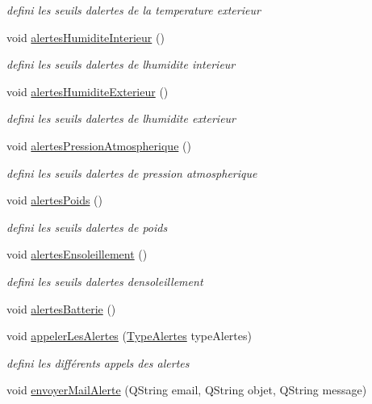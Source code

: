 \begin{DoxyCompactItemize}
\begin{DoxyCompactList}\small\item\em defini les seuils d\textquotesingle{}alertes de la temperature exterieur \end{DoxyCompactList}\item 
void \hyperlink{class_alertes_a7558cb097dc392547ceb12ab4d6cbd4c}{alertes\+Humidite\+Interieur} ()
\begin{DoxyCompactList}\small\item\em defini les seuils d\textquotesingle{}alertes de l\textquotesingle{}humidite interieur \end{DoxyCompactList}\item 
void \hyperlink{class_alertes_a8606946eaa04dfd29bb7951b2b850a04}{alertes\+Humidite\+Exterieur} ()
\begin{DoxyCompactList}\small\item\em defini les seuils d\textquotesingle{}alertes de l\textquotesingle{}humidite exterieur \end{DoxyCompactList}\item 
void \hyperlink{class_alertes_ab8a33e82cdd4d4e0560c9ba6e10ca8d5}{alertes\+Pression\+Atmospherique} ()
\begin{DoxyCompactList}\small\item\em defini les seuils d\textquotesingle{}alertes de pression atmospherique \end{DoxyCompactList}\item 
void \hyperlink{class_alertes_ac4b8925cc6c262cf7254b1576ba07d33}{alertes\+Poids} ()
\begin{DoxyCompactList}\small\item\em defini les seuils d\textquotesingle{}alertes de poids \end{DoxyCompactList}\item 
void \hyperlink{class_alertes_ae7ad960c530a6a7e82df3ed55d159a68}{alertes\+Ensoleillement} ()
\begin{DoxyCompactList}\small\item\em defini les seuils d\textquotesingle{}alertes d\textquotesingle{}ensoleillement \end{DoxyCompactList}\item 
void \hyperlink{class_alertes_ad708a4b800d56c1439b65d12a3c6b027}{alertes\+Batterie} ()
\item 
void \hyperlink{class_alertes_ad04a02dcc6e6f14da0784c7054888b05}{appeler\+Les\+Alertes} (\hyperlink{parametres_8h_a83a725fd153179a2bd97afcc8307737b}{Type\+Alertes} type\+Alertes)
\begin{DoxyCompactList}\small\item\em defini les différents appels des alertes \end{DoxyCompactList}\item 
void \hyperlink{class_alertes_a375783502a78109f3323dc1ed90cfdc9}{envoyer\+Mail\+Alerte} (Q\+String email, Q\+String objet, Q\+String message)
\end{DoxyCompactItemize}
